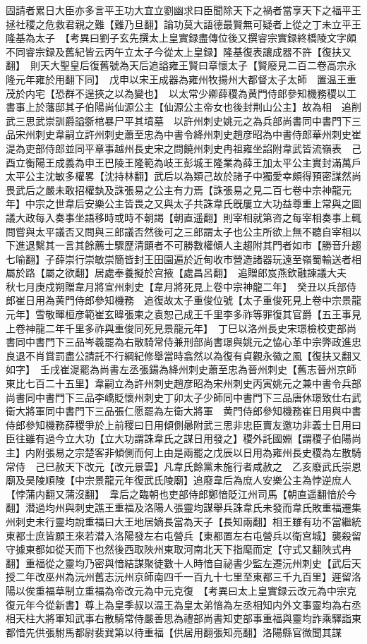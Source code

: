 固請者累日大臣亦多言平王功大宜立劉幽求曰臣聞除天下之禍者當享天下之福平王拯社稷之危救君親之難【難乃旦翻】論功莫大語德最賢無可疑者上從之丁未立平王隆基為太子　【考異曰劉子玄先撰太上皇實録盡傳位後又撰睿宗實録終橋陵文字頗不同睿宗録及舊紀皆云丙午立太子今從太上皇録】隆基復表讓成器不許【復扶又翻】　則天大聖皇后復舊號為天后追謚雍王賢曰章懷太子【賢廢見二百二卷高宗永隆元年雍於用翻下同】　戊申以宋王成器為雍州牧揚州大都督太子太師　置温王重茂於内宅【恐群不逞挾之以為變也】　以太常少卿薛稷為黄門侍郎參知機務稷以工書事上於藩邸其子伯陽尚仙源公主【仙源公主帝女也後封荆山公主】故為相　追削武三思武崇訓爵謚斵棺暴尸平其墳墓　以許州刺史姚元之為兵部尚書同中書門下三品宋州刺史韋嗣立許州刺史蕭至忠為中書令絳州刺史趙彦昭為中書侍郎華州刺史崔湜為吏部侍郎並同平章事越州長史宋之問饒州刺史冉祖雍坐諂附韋武皆流嶺表　己酉立衡陽王成義為申王巴陵王隆範為岐王彭城王隆業為薛王加太平公主實封滿萬戶太平公主沈敏多權畧【沈持林翻】武后以為類己故於諸子中獨愛幸頗得預密謀然尚畏武后之嚴未敢招權埶及誅張易之公主有力焉【誅張易之見二百七卷中宗神龍元年】中宗之世韋后安樂公主皆畏之又與太子共誅韋氏旣屢立大功益尊重上常與之圖議大政每入奏事坐語移時或時不朝謁【朝直遥翻】則宰相就第咨之每宰相奏事上輒問嘗與太平議否又問與三郎議否然後可之三郎謂太子也公主所欲上無不聽自宰相以下進退繫其一言其餘薦士驟歷清顕者不可勝數權傾人主趨附其門者如市【勝音升趨七喻翻】子薛崇行崇敏崇簡皆封王田園遍於近甸收市營造諸器玩遠至嶺蜀輸送者相屬於路【屬之欲翻】居處奉養擬於宫掖【處昌呂翻】　追贈郎岌燕欽融諫議大夫　秋七月庚戍朔贈韋月將宣州刺史【韋月將死見上卷中宗神龍二年】　癸丑以兵部侍郎崔日用為黄門侍郎參知機務　追復故太子重俊位號【太子重俊死見上卷中宗景龍元年】雪敬暉桓彦範崔玄暐張柬之袁恕己成王千里李多祚等罪復其官爵【五王事見上卷神龍二年千里多祚與重俊同死見景龍元年】　丁巳以洛州長史宋璟檢校吏部尚書同中書門下三品岑羲罷為右散騎常侍兼刑部尚書璟與姚元之恊心革中宗弊政進忠良退不肖賞罰盡公請託不行綱紀修舉當時翕然以為復有貞觀永徽之風【復扶又翻又如字】　壬戌崔湜罷為尚書左丞張鍚為絳州刺史蕭至忠為晉州刺史【舊志晉州京師東比七百二十五里】韋嗣立為許州刺史趙彦昭為宋州刺史丙寅姚元之兼中書令兵部尚書同中書門下三品李嶠貶懷州刺史丁卯太子少師同中書門下三品唐休璟致仕右武衛大將軍同中書門下三品張仁愿罷為左衛大將軍　黄門侍郎參知機務崔日用與中書侍郎參知機務薛稷爭於上前稷曰日用傾側曏附武三思非忠臣賣友邀功非義士日用曰臣往雖有過今立大功【立大功謂誅韋氏之謀日用發之】稷外託國婣【謂稷子伯陽尚主】内附張易之宗楚客非傾側而何上由是兩罷之戊辰以日用為雍州長史稷為左散騎常侍　己巳赦天下改元【改元景雲】凡韋氏餘黨未施行者咸赦之　乙亥廢武氏崇恩廟及昊陵順陵【中宗景龍元年復武氏陵廟】追廢韋后為庶人安樂公主為悖逆庶人【悖蒲内翻又蒲沒翻】　韋后之臨朝也吏部侍郎鄭愔貶江州司馬【朝直遥翻愔於今翻】潜過均州與刺史譙王重福及洛陽人張靈均謀舉兵誅韋氏未發而韋氏敗重福遷集州刺史未行靈均說重福曰大王地居嫡長當為天子【長知兩翻】相王雖有功不當繼統東都士庶皆願王來若潜入洛陽發左右屯營兵【東都置左右屯營兵以衛宫城】襲殺留守據東都如從天而下也然後西取陜州東取河南北天下指麾而定【守式又翻陜式冉翻】重福從之靈均乃密與愔結謀聚徒數十人時愔自祕書少監左遷沅州刺史【武后天授二年改巫州為沅州舊志沅州京師南四千一百九十七里至東都三千九百里】遲留洛陽以俟重福草制立重福為帝改元為中元克復　【考異曰太上皇實録云改元為中宗克復元年今從新書】尊上為皇季叔以温王為皇太弟愔為左丞相知内外文事靈均為右丞相天柱大將軍知武事右散騎常侍嚴善思為禮部尚書知吏部事重福與靈均詐乘驛詣東都愔先供張駙馬都尉裴巽第以待重福【供居用翻張知亮翻】洛陽縣官微聞其謀

